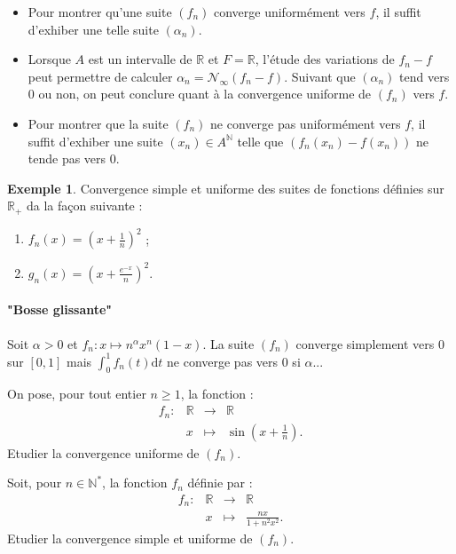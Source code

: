 \documentclass[french]{article}
\newcommand{\N}{\mathbb{N}}
\newcommand{\R}{\mathbb{R}}
\newcommand{\st}{^*}
\renewcommand{\d}{\text{d}}
\theoremstyle{plain}
\theoremstyle{definition}
\newtheorem*{ex}{Exemple}
\theoremstyle{remark}
\begin{document}
\begin{met}
	\begin{itemize}
		\item Pour montrer qu'une suite $(f_n)$ converge uniformément vers $f$, il suffit d'exhiber une telle suite $(\alpha_n)$.
		\item Lorsque $A$ est un intervalle de $\R$ et $F=\R$, l'étude des variations de $f_n-f$ peut permettre de calculer $\alpha_n=\mathcal{N}_\infty(f_n-f)$. Suivant que $(\alpha_n)$ tend vers $0$ ou non, on peut conclure quant à la convergence uniforme de $(f_n)$ vers $f$.
		\item Pour montrer que la suite $(f_n)$ ne converge pas uniformément vers $f$, il suffit d'exhiber une suite $(x_n)\in A^\N$ telle que $(f_n(x_n)-f(x_n))$ ne tende pas vers $0$.
	\end{itemize}
\end{met}

\begin{ex}
	Convergence simple et uniforme des suites de fonctions définies sur $\R_+$ da la façon suivante :
	\begin{enumerate}
		\item $f_n(x)=\displaystyle\left(x+\frac{1}{n}\right)^2$ ;
		\item $g_n(x)=\displaystyle\left(x+\frac{e^{-x}}{n}\right)^2$.
	\end{enumerate}
\end{ex}

\paragraph{"Bosse glissante"} Soit $\alpha>0$ et $f_n:x\mapsto n^{\alpha}x^n(1-x)$. La suite $(f_n)$ converge simplement vers $0$ sur $[0,1]$ mais $\displaystyle\int_{0}^{1}f_n(t)\d t$ ne converge pas vers $0$ si $\alpha$... %

\begin{exo}
	On pose, pour tout entier $n\geqslant 1$, la fonction :
	$$\begin{array}{lrcl}
		f_n:&\R&\longrightarrow&\R\\
		&x&\longmapsto&\sin\displaystyle\left(x+\frac{1}{n}\right).
	\end{array}$$
	Etudier la convergence uniforme de $(f_n)$.
\end{exo}

\begin{exo}
	Soit, pour $n\in\N\st$, la fonction $f_n$ définie par :
	$$\begin{array}{lrcl}
		f_n:&\R&\longrightarrow&\R\\
		&x&\longmapsto&\displaystyle\frac{nx}{1+n^2x^2}.
	\end{array}$$
	Etudier la convergence simple et uniforme de $(f_n)$.
\end{exo}
\end{document}
